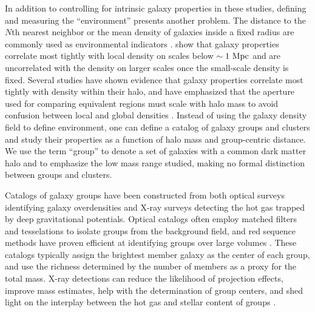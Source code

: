 In addition to controlling for intrinsic galaxy
properties in these studies, defining and measuring the
``environment'' presents another problem. The distance to the $N$th
nearest neighbor or the mean density of galaxies inside a fixed radius
are commonly used as environmental indicators
\citep[e.g.,][]{Dressler1980}. \citet{Kauffmann2004}
show that galaxy properties correlate most tightly with
local density on scales below $\sim1~\rm{Mpc}$ and are uncorrelated
with the density on larger scales once the small-scale density is
fixed. Several studies have shown evidence
that galaxy properties correlate most tightly with density within
their halo, and have emphasized that the aperture used for comparing
equivalent regions must scale with halo mass to avoid confusion
between local and global densities \citep{Hansen2005, Weinmann2006,
  Blanton2007, Haas2011}. Instead of using the galaxy density field to
define environment, one can define a catalog of galaxy groups and
clusters and study their properties as a function of halo mass and
group-centric distance. We use the term ``group'' to
denote a set of galaxies with a common dark matter halo and to
emphasize the low mass range studied, making no formal distinction
between groups and clusters.

Catalogs of galaxy groups have been constructed from both optical
surveys identifying galaxy overdensities and X-ray surveys detecting
the hot gas trapped by deep gravitational potentials. Optical catalogs
often employ matched filters \citep[e.g.,][]{Postman1996} and tesselations
\citep[e.g.,][]{Marinoni2002, Gerke2005} to isolate groups from the
background field, and red sequence methods have proven efficient at
identifying groups over large volumes \citep[e.g.,][]{Gladders2005,
  Koester2007b}. These catalogs 
typically assign the brightest member galaxy as the center of
each group, and use the richness determined by the number of members
as a proxy for the total mass. X-ray detections can reduce the
likelihood of projection effects, improve mass estimates, help with
the determination of group centers, and shed light on the interplay
between the hot gas and stellar content of groups
\citep[e.g.,][]{Mulchaey2003, Lin2004a, Finoguenov2007,
  Sun2009}.

